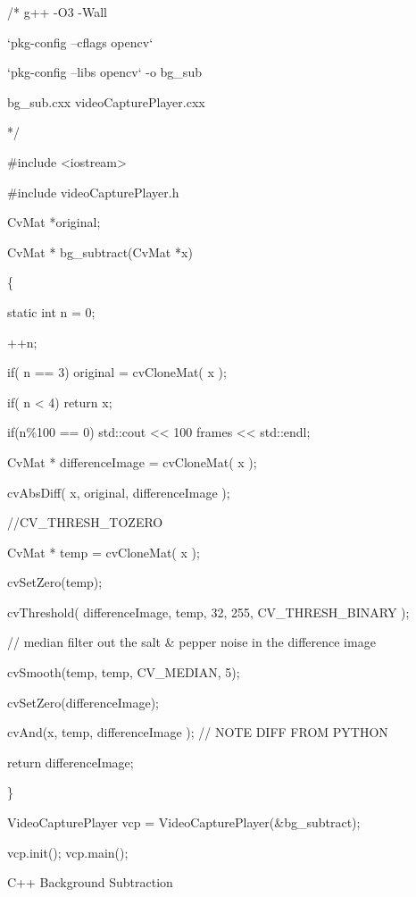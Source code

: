 \documentclass[english]{IEEEtran}
\theoremstyle{plain}
\begin{document}
%
\begin{algorithm*}
/{*} g++ -O3 -Wall

`pkg-config --cflags opencv` 

`pkg-config --libs opencv` -o bg\_sub 

bg\_sub.cxx videoCapturePlayer.cxx

{*}/

\#include <iostream>

\#include \textquotedbl{}videoCapturePlayer.h\textquotedbl{}

CvMat {*}original;

CvMat {*} bg\_subtract(CvMat {*}x)

\{

static int n = 0;

++n;

if( n == 3) original = cvCloneMat( x );

if( n < 4) return x;

if(n\%100 == 0) std::cout <\textcompwordmark{}< \textquotedbl{}100
frames\textquotedbl{} <\textcompwordmark{}< std::endl;

CvMat {*} differenceImage = cvCloneMat( x );

cvAbsDiff( x, original, differenceImage );

//CV\_THRESH\_TOZERO

CvMat {*} temp = cvCloneMat( x );

cvSetZero(temp);

cvThreshold( differenceImage, temp, 32, 255, CV\_THRESH\_BINARY );

// median filter out the salt \& pepper noise in the difference image

cvSmooth(temp, temp, CV\_MEDIAN, 5);

cvSetZero(differenceImage);

cvAnd(x, temp, differenceImage ); // NOTE DIFF FROM PYTHON

return differenceImage;

\}

VideoCapturePlayer vcp = VideoCapturePlayer(\&bg\_subtract);

vcp.init(); vcp.main();



\caption{C++ Background Subtraction}



\end{algorithm*}
\end{document}
